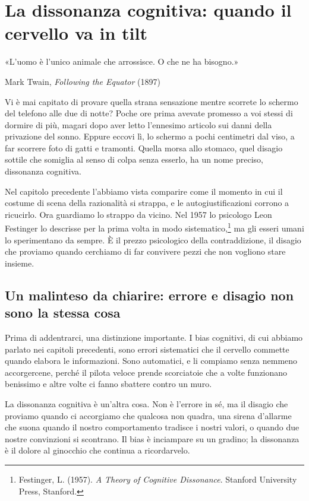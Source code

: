 \chapter{La dissonanza cognitiva: quando il cervello va in tilt}
\label{cap:p1c22}

\epigraph{«L'uomo è l'unico animale che arrossisce. O che ne ha bisogno.»}{Mark Twain, \textit{Following the Equator} (1897)}

Vi è mai capitato di provare quella strana sensazione mentre scorrete lo schermo del telefono alle due di notte? Poche ore prima avevate promesso a voi stessi di dormire di più, magari dopo aver letto l'ennesimo articolo sui danni della privazione del sonno. Eppure eccovi lì, lo schermo a pochi centimetri dal viso, a far scorrere foto di gatti e tramonti. Quella morsa allo stomaco, quel disagio sottile che somiglia al senso di colpa senza esserlo, ha un nome preciso, dissonanza cognitiva.

Nel capitolo precedente l'abbiamo vista comparire come il momento in cui il costume di scena della razionalità si strappa, e le autogiustificazioni corrono a ricucirlo. Ora guardiamo lo strappo da vicino. Nel 1957 lo psicologo Leon Festinger lo descrisse per la prima volta in modo sistematico,\footnote{Festinger, L. (1957). \textit{A Theory of Cognitive Dissonance}. Stanford University Press, Stanford.} ma gli esseri umani lo sperimentano da sempre. È il prezzo psicologico della contraddizione, il disagio che proviamo quando cerchiamo di far convivere pezzi che non vogliono stare insieme.

\section{Un malinteso da chiarire: errore e disagio non sono la stessa cosa}

Prima di addentrarci, una distinzione importante. I bias cognitivi, di cui abbiamo parlato nei capitoli precedenti, sono errori sistematici che il cervello commette quando elabora le informazioni. Sono automatici, e li compiamo senza nemmeno accorgercene, perché il pilota veloce prende scorciatoie che a volte funzionano benissimo e altre volte ci fanno sbattere contro un muro.

La dissonanza cognitiva è un'altra cosa. Non è l'errore in sé, ma il disagio che proviamo quando ci accorgiamo che qualcosa non quadra, una sirena d'allarme che suona quando il nostro comportamento tradisce i nostri valori, o quando due nostre convinzioni si scontrano. Il bias è inciampare su un gradino; la dissonanza è il dolore al ginocchio che continua a ricordarvelo.

